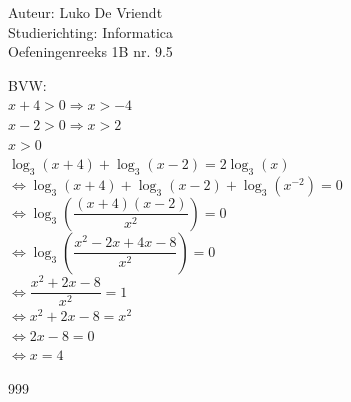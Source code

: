 \documentclass[a4paper]{article}
\begin{document}
\noindent \large Auteur: Luko De Vriendt\\
\noindent \large Studierichting: Informatica\\
\noindent \large Oefeningenreeks 1B nr. 9.5\\

\medskip

\normalsize


BVW: \\

$x+4 > 0 \Rightarrow x > -4$ \\

$x-2 > 0 \Rightarrow x > 2$ \\

$x > 0 $ \\

$\log_3 (x+4) + \log_3 (x-2) = 2\log_3 (x)$ \\

$\Leftrightarrow \log_3 (x+4) + \log_3 (x-2) + \log_3 \left(x^{-2}\right) = 0$ \\

$\Leftrightarrow \log_3 \left(\dfrac{(x+4)(x-2)}{x^2}\right) = 0$ \\

$\Leftrightarrow \log_3 \left(\dfrac{x^2-2x+4x-8}{x^2}\right) = 0$ \\

$\Leftrightarrow \dfrac{x^2+2x-8}{x^2} = 1$ \\

$\Leftrightarrow x^2+2x-8 = x^2$ \\

$\Leftrightarrow 2x-8 = 0$ \\

$\Leftrightarrow x = 4$ \\

\begin{thebibliography}{999}
\end{thebibliography}
\end{document}
